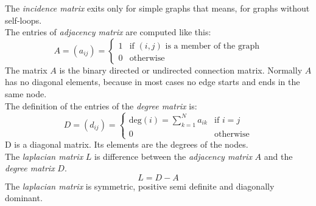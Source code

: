 \documentclass[12pt]{report}
\begin{document}
The \textit{incidence matrix} exits only for simple graphs that means, for graphs without self-loops.\\
The entries of \textit{adjacency matrix} are computed like this: \\
\begin{equation}
A=(a_{ij})= \left\{ \begin{array}{ll}
					1 & \mbox{if }(i,j) \mbox{ is a member of the graph} \\
					0 & \mbox{otherwise}
					\end{array}\right.
					\label{EQ:gleichung2}
\end{equation}
The matrix $ A $ is the binary directed or undirected connection matrix. Normally $ A $ has no diagonal elements, because in most cases no edge starts and ends in the same node.\\
The definition of the entries of the \textit{degree matrix} is: \\
\begin{equation}
D=(d_{ij})= \left\{ \begin{array}{ll}
					\mbox{deg}(i) = \sum_{k=1}^{N}a_{ik} & \mbox{if } i=j \\
					0 & \mbox{otherwise}
					\end{array}\right.
					\label{EQ:gleichung3}
\end{equation}
D is a diagonal matrix. Its elements are the degrees of the nodes.\\
The \textit{laplacian matrix} $ L $ is difference between the \textit{adjacency matrix} $ A $ and the \textit{degree matrix} $ D $.\\
\begin{equation}
L=D-A
\label{EQ:gleichung4}
\end{equation}
The \textit{laplacian matrix} is symmetric, positive semi definite and diagonally dominant.\\
\end{document}
